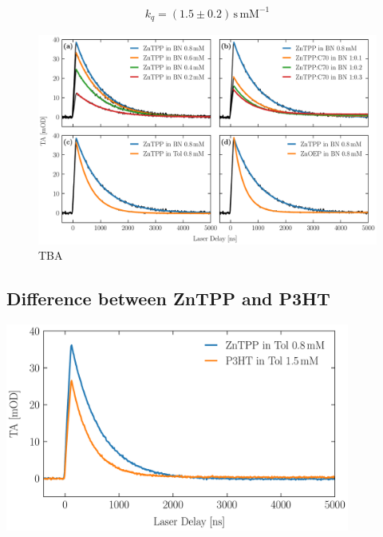 \begin{gather*}
    \boxed{k_q = (1.5 \pm 0.2)\,\mathrm{s\,mM^{-1}}} %
\end{gather*}

\begin{center}
    \begin{figure}
    \centering
    \includegraphics[width = \textheight]{Pictures/Evaluation/42/Lifetime.pdf}
    \caption{TBA}
    \label{fig:lifetimeDecay}
    \end{figure}
\end{center}
\newpage

\subsection{Difference between ZnTPP and P3HT}
\label{sub:difference}

\begin{center}
    \captionsetup{type = figure}
    \includegraphics[width = 0.85\textwidth]{Pictures/Evaluation/42/Difference.pdf}
    \label{fig:difference}
\end{center}

